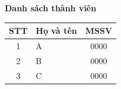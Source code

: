 \documentclass[14pt, a4paper]{article}
\theoremstyle{definition}
\begin{document}

\newpage
\textbf{\Large Danh sách thành viên}

\bigskip
\begin{table}[h]
\centering
{} %
\begin{tabularx}{\textwidth}{|c|X|c|}
\hline
\rowcolor{blue!20}
\textbf{STT} & \textbf{Họ và tên} & \textbf{MSSV} \\
\hline
1 & A & 0000\\
2 & B & 0000\\
3 & C & 0000 \\
\hline
\end{tabularx}
\end{table}
\newpage
\newpage


\newpage
\newpage
\newpage
\end{document}
